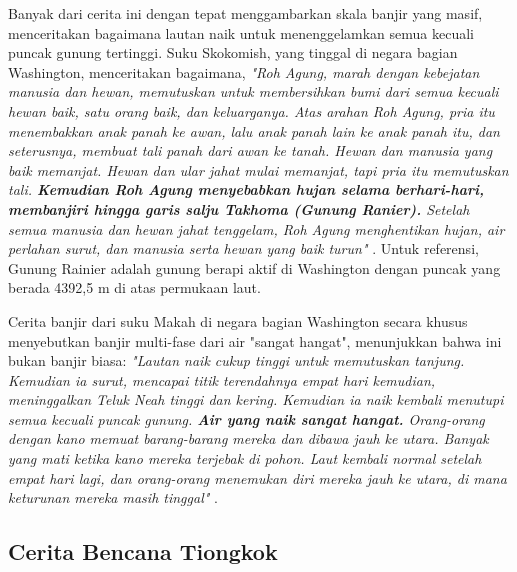 \documentclass[10pt,twocolumn,letterpaper]{article}
\begin{document}
Banyak dari cerita ini dengan tepat menggambarkan skala banjir yang masif, menceritakan bagaimana lautan naik untuk menenggelamkan semua kecuali puncak gunung tertinggi. Suku Skokomish, yang tinggal di negara bagian Washington, menceritakan bagaimana, \textit{"Roh Agung, marah dengan kebejatan manusia dan hewan, memutuskan untuk membersihkan bumi dari semua kecuali hewan baik, satu orang baik, dan keluarganya. Atas arahan Roh Agung, pria itu menembakkan anak panah ke awan, lalu anak panah lain ke anak panah itu, dan seterusnya, membuat tali panah dari awan ke tanah. Hewan dan manusia yang baik memanjat. Hewan dan ular jahat mulai memanjat, tapi pria itu memutuskan tali. \textbf{Kemudian Roh Agung menyebabkan hujan selama berhari-hari, membanjiri hingga garis salju Takhoma (Gunung Ranier).} Setelah semua manusia dan hewan jahat tenggelam, Roh Agung menghentikan hujan, air perlahan surut, dan manusia serta hewan yang baik turun"} \cite{3}. Untuk referensi, Gunung Rainier adalah gunung berapi aktif di Washington dengan puncak yang berada 4392,5 m di atas permukaan laut.

Cerita banjir dari suku Makah di negara bagian Washington secara khusus menyebutkan banjir multi-fase dari air "sangat hangat", menunjukkan bahwa ini bukan banjir biasa: \textit{"Lautan naik cukup tinggi untuk memutuskan tanjung. Kemudian ia surut, mencapai titik terendahnya empat hari kemudian, meninggalkan Teluk Neah tinggi dan kering. Kemudian ia naik kembali menutupi semua kecuali puncak gunung. \textbf{Air yang naik sangat hangat.} Orang-orang dengan kano memuat barang-barang mereka dan dibawa jauh ke utara. Banyak yang mati ketika kano mereka terjebak di pohon. Laut kembali normal setelah empat hari lagi, dan orang-orang menemukan diri mereka jauh ke utara, di mana keturunan mereka masih tinggal"} \cite{3}.

\subsection{Cerita Bencana Tiongkok}
\end{document}
